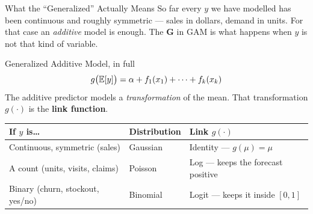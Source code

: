 \documentclass[aspectratio=169, 11pt]{beamer}
\begin{document}
\begin{frame}{What the ``Generalized'' Actually Means}
  So far every $y$ we have modelled has been continuous and roughly symmetric --- sales in
  dollars, demand in units. For that case an \emph{additive} model is enough.
  The \textbf{G} in GAM is what happens when $y$ is not that kind of variable.
  \begin{definitionbox}{Generalized Additive Model, in full}
    \vspace{-4pt}
    \[
      g\big(\mathbb{E}[y]\big) = \alpha + f_1(x_1) + \cdots + f_k(x_k)
    \]
    \vspace{-6pt}
    \small The additive predictor models a \emph{transformation} of the mean. That
    transformation $g(\cdot)$ is the \textbf{link function}.
  \end{definitionbox}
  \begin{center}
    {\small
    \begin{tabular}{lll}
      \toprule
      \textbf{If $y$ is\ldots} & \textbf{Distribution} & \textbf{Link $g(\cdot)$} \\
      \midrule
      Continuous, symmetric (sales) & Gaussian  & Identity --- $g(\mu)=\mu$ \\
      A count (units, visits, claims) & Poisson   & Log --- keeps the forecast positive \\
      Binary (churn, stockout, yes/no) & Binomial  & Logit --- keeps it inside $[0,1]$ \\
      \bottomrule
    \end{tabular}
    }
  \end{center}
  \vspace{-0.1cm}
\end{frame}
\end{document}
